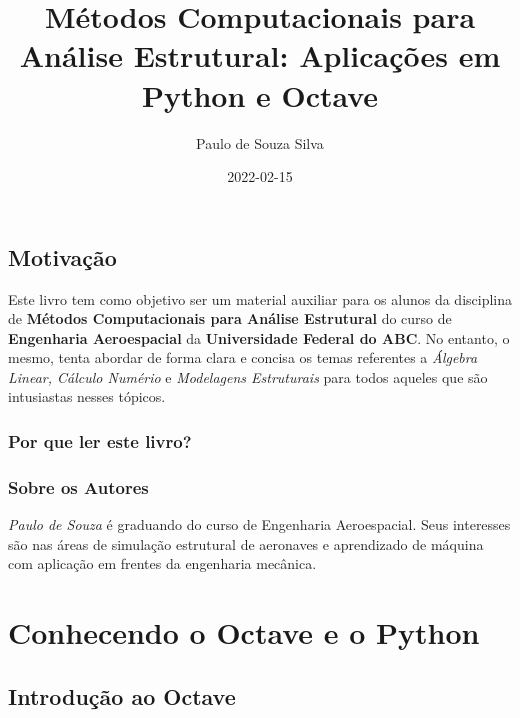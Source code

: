 \documentclass[
]{book}
\title{Métodos Computacionais para Análise Estrutural: Aplicações em Python e Octave}
\author{Paulo de Souza Silva}
\date{2022-02-15}
\begin{document}
\maketitle

{
\setcounter{tocdepth}{1}
\tableofcontents
}
\hypertarget{motivauxe7uxe3o}{%
\chapter*{Motivação}\label{motivauxe7uxe3o}}

Este livro tem como objetivo ser um material auxiliar para os alunos da disciplina de \textbf{Métodos Computacionais para Análise Estrutural} do curso de \textbf{Engenharia Aeroespacial} da \textbf{Universidade Federal do ABC}. No entanto, o mesmo, tenta abordar de forma clara e concisa os temas referentes a \emph{Álgebra Linear, Cálculo Numério} e \emph{Modelagens Estruturais} para todos aqueles que são intusiastas nesses tópicos.

\hypertarget{por-que-ler-este-livro}{%
\section*{Por que ler este livro?}\label{por-que-ler-este-livro}}

\hypertarget{sobre-os-autores}{%
\section*{Sobre os Autores}\label{sobre-os-autores}}

\emph{Paulo de Souza} é graduando do curso de Engenharia Aeroespacial. Seus interesses são nas áreas de simulação estrutural de aeronaves e aprendizado de máquina com aplicação em frentes da engenharia mecânica.

\hypertarget{part-conhecendo-o-octave-e-o-python}{%
\part{Conhecendo o Octave e o Python}\label{part-conhecendo-o-octave-e-o-python}}

\hypertarget{introduuxe7uxe3o-ao-octave}{%
\chapter{Introdução ao Octave}\label{introduuxe7uxe3o-ao-octave}}
\end{document}
